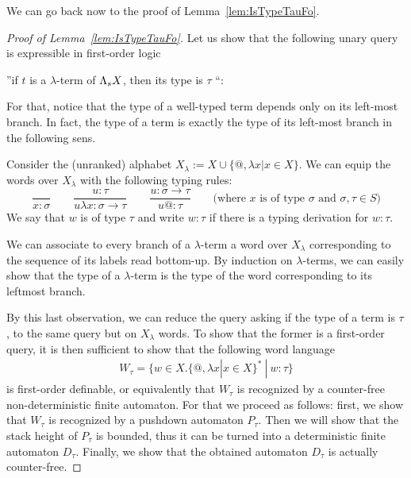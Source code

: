 We can go back now to the proof of Lemma~\ref{lem:IsTypeTauFo}.
\begin{proof}[Proof of Lemma~\ref{lem:IsTypeTauFo}]
Let us show that the following unary query is expressible in first-order logic
\begin{center}
''if $t$ is a $\lambda$-term of $\Lambda_{s} X$, then its type is $\tau$ ``:
\end{center}
 For that, notice that the type of a well-typed term depends only on its left-most branch. In fact, the type of a term is exactly the type of its left-most branch in the following sens.

Consider the (unranked) alphabet $ X_\lambda:= X\cup \{@, \lambda x | x\in X\}$. We can equip the words over $X_\lambda$ with the following typing rules:
$$\frac{}{x: \sigma} \qquad \frac{u:\tau}{u\lambda x: \sigma\rightarrow \tau} \qquad \frac{u:\sigma\rightarrow\tau}{u@:\tau}\qquad\text{(where $x$ is of type $\sigma$ and $\sigma,\tau \in S$)}$$
We say that $w$ is of type $\tau$ and write $w:\tau$ if there is a typing derivation for $w:\tau$.

We can associate to every branch of a $\lambda$-term a word over $X_\lambda$ corresponding to the sequence of its labels read bottom-up. By induction on $\lambda$-terms, we can easily show that the type of a $\lambda$-term is the type of the word corresponding to its leftmost branch. 

By this last observation, we can reduce the query asking if the type of a term is $\tau$, to the same query but on $X_\lambda$ words. To show that the former is a first-order query, it is then sufficient to show that the following word language 
\begin{align*}
W_\tau = \{w\in X.\{@, \lambda x | x\in X\}^*\ |\ w:\tau \} 
\end{align*}
is first-order definable, or equivalently that  $W_\tau$ is recognized by a counter-free non-deterministic finite automaton. For that we proceed as follows: first, we show that $W_\tau$ is recognized by a pushdown automaton $P_\tau$. Then we will show that the stack height of $P_\tau$ is bounded, thus it can be turned into a deterministic finite automaton $D_\tau$. Finally, we show that the obtained automaton $D_\tau$ is actually counter-free.  



\end{proof}
